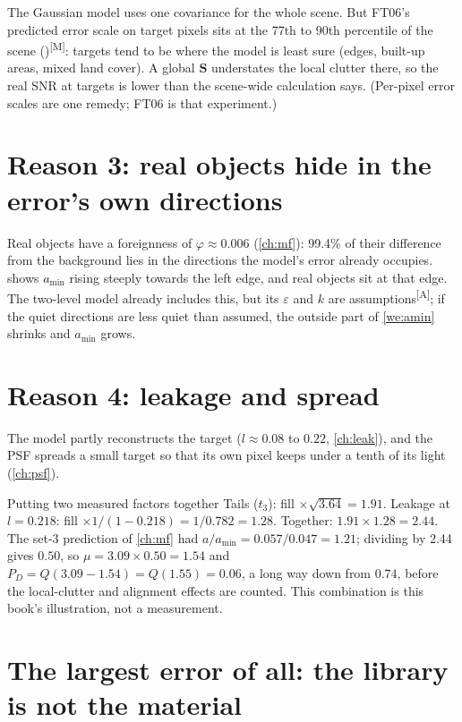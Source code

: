 \documentclass[11pt,a4paper,oneside,openany]{book}
\newcommand{\B}[1]{{\symbf{#1}}}
\newcommand{\B}[1]{{\bm{#1}}}
\newcommand{\meas}{\textsuperscript{\textsf{\scriptsize[M]}}}
\newcommand{\assm}{\textsuperscript{\textsf{\scriptsize[A]}}}
\newcommand{\mS}{\B{S}}
\begin{document}
The Gaussian model uses one covariance for the whole scene. But FT06's predicted error scale on target pixels sits at the 77th to 90th percentile of the scene
()\meas: targets tend to be where the model is least sure (edges, built-up areas, mixed land cover). A global $\mS$
understates the local clutter there, so the real SNR at targets is lower than the scene-wide calculation says. (Per-pixel error scales are one remedy; FT06 is that
experiment.)

\section{Reason 3: real objects hide in the error's own directions}

Real objects have a foreignness of $\varphi\approx0.006$ (\cref{ch:mf}): 99.4\% of their difference from the background lies in the directions the model's error already
occupies.  shows $a_{\min}$ rising steeply towards the left edge, and real objects sit at that edge. The two-level model already includes this, but its
$\varepsilon$ and $k$ are assumptions\assm; if the quiet directions are less quiet than assumed, the outside part of \cref{we:amin} shrinks and $a_{\min}$ grows.

\section{Reason 4: leakage and spread}

The model partly reconstructs the target ($l\approx0.08$ to $0.22$, \cref{ch:leak}), and the PSF spreads a small target so that its own pixel keeps under a tenth of its
light (\cref{ch:psf}).

\begin{worked}[label=we:factors]{Putting two measured factors together}
Tails ($t_3$): fill $\times\sqrt{3.64}=1.91$. Leakage at $l=0.218$: fill $\times1/(1-0.218)=1/0.782=1.28$. Together: $1.91\times1.28=2.44$. The set-3 prediction of
\cref{ch:mf} had $a/a_{\min}=0.057/0.047=1.21$; dividing by 2.44 gives $0.50$, so $\mu=3.09\times0.50=1.54$ and $P_D=Q(3.09-1.54)=Q(1.55)=0.06$, a long way down from
$0.74$, before the local-clutter and alignment effects are counted. This combination is this book's illustration, not a measurement.
\end{worked}

\section{The largest error of all: the library is not the material}
\end{document}
